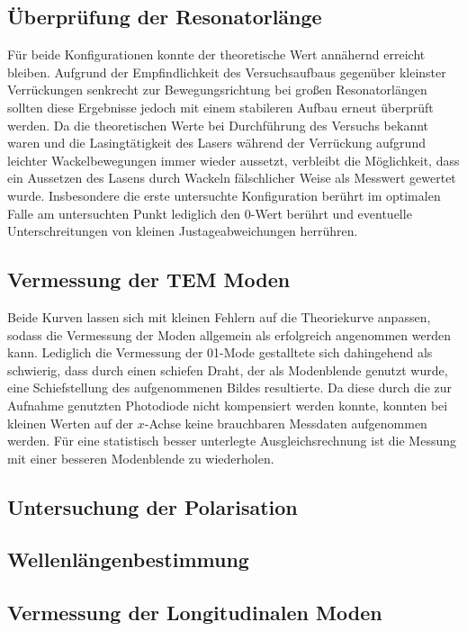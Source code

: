 \subsection{Überprüfung der Resonatorlänge}
Für beide Konfigurationen konnte der theoretische Wert annähernd erreicht bleiben.
Aufgrund der Empfindlichkeit des Versuchsaufbaus gegenüber kleinster Verrückungen
senkrecht zur Bewegungsrichtung bei großen Resonatorlängen sollten diese
Ergebnisse jedoch mit einem stabileren Aufbau erneut überprüft werden.
Da die theoretischen Werte bei Durchführung des Versuchs bekannt waren und die
Lasingtätigkeit des Lasers während der Verrückung aufgrund leichter Wackelbewegungen
immer wieder aussetzt, verbleibt die Möglichkeit, dass ein Aussetzen des Lasens
durch Wackeln fälschlicher Weise als Messwert gewertet wurde.
Insbesondere die erste untersuchte Konfiguration berührt im optimalen Falle
am untersuchten Punkt lediglich den $0$-Wert berührt und eventuelle Unterschreitungen
von kleinen Justageabweichungen herrühren.

\subsection{Vermessung der TEM Moden}
Beide Kurven lassen sich mit kleinen Fehlern auf die Theoriekurve anpassen,
sodass die Vermessung der Moden allgemein als erfolgreich angenommen werden kann.
Lediglich die Vermessung der 01-Mode gestalltete sich dahingehend als schwierig,
dass durch einen schiefen Draht, der als Modenblende genutzt wurde, eine Schiefstellung
des aufgenommenen Bildes resultierte. Da diese durch die zur Aufnahme genutzten
Photodiode nicht kompensiert werden konnte, konnten bei kleinen Werten auf der
$x$-Achse keine brauchbaren Messdaten aufgenommen werden.
Für eine statistisch besser unterlegte Ausgleichsrechnung ist die Messung mit
einer besseren Modenblende zu wiederholen.

\subsection{Untersuchung der Polarisation}

\subsection{Wellenlängenbestimmung}

\subsection{Vermessung der Longitudinalen Moden}
